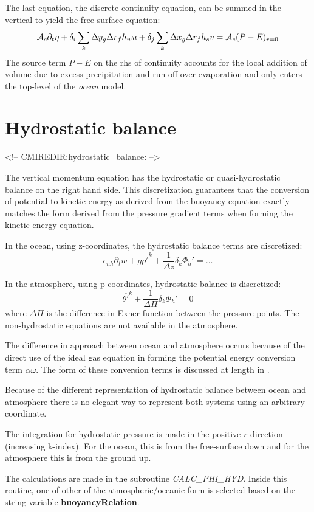 The last equation, the discrete continuity equation, can be summed in
the vertical to yield the free-surface equation:
\begin{equation}
{\cal A}_c \partial_t \eta + \delta_i \sum_k \Delta y_g \Delta r_f h_w
u + \delta_j \sum_k \Delta x_g \Delta r_f h_s v = {\cal
A}_c(P-E)_{r=0} \label{eq:discrete-freesurface}
\end{equation}
The source term $P-E$ on the rhs of continuity accounts for the local
addition of volume due to excess precipitation and run-off over
evaporation and only enters the top-level of the {\em ocean} model.

\section{Hydrostatic balance}
\begin{rawhtml}
<!-- CMIREDIR:hydrostatic_balance: -->
\end{rawhtml}

The vertical momentum equation has the hydrostatic or
quasi-hydrostatic balance on the right hand side. This discretization
guarantees that the conversion of potential to kinetic energy as
derived from the buoyancy equation exactly matches the form derived
from the pressure gradient terms when forming the kinetic energy
equation.

In the ocean, using z-coordinates, the hydrostatic balance terms are
discretized:
\begin{equation}
\epsilon_{nh} \partial_t w
+ g \overline{\rho'}^k + \frac{1}{\Delta z} \delta_k \Phi_h' = \ldots
\label{eq:discrete_hydro_ocean}
\end{equation}

In the atmosphere, using p-coordinates, hydrostatic balance is
discretized:
\begin{equation}
\overline{\theta'}^k + \frac{1}{\Delta \Pi} \delta_k \Phi_h' = 0
\label{eq:discrete_hydro_atmos}
\end{equation}
where $\Delta \Pi$ is the difference in Exner function between the
pressure points. The non-hydrostatic equations are not available in
the atmosphere.

The difference in approach between ocean and atmosphere occurs because
of the direct use of the ideal gas equation in forming the potential
energy conversion term $\alpha \omega$. The form of these conversion
terms is discussed at length in \cite{adcroft:02}.

Because of the different representation of hydrostatic balance between
ocean and atmosphere there is no elegant way to represent both systems
using an arbitrary coordinate.

The integration for hydrostatic pressure is made in the positive $r$
direction (increasing k-index). For the ocean, this is from the
free-surface down and for the atmosphere this is from the ground up.

The calculations are made in the subroutine {\em
CALC\_PHI\_HYD}. Inside this routine, one of other of the
atmospheric/oceanic form is selected based on the string variable {\bf
buoyancyRelation}.

